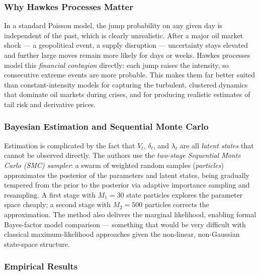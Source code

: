 \documentclass[12pt,a4paper]{article}
\begin{document}
\subsubsection*{Why Hawkes Processes Matter}

In a standard Poisson model, the jump probability on any given
day is independent of the past, which is clearly unrealistic.
After a major oil market shock --- a geopolitical event, a supply
disruption --- uncertainty stays elevated and further large moves
remain more likely for days or weeks. Hawkes processes model this
\textit{financial contagion} directly: each jump raises the
intensity, so consecutive extreme events are more probable.
This makes them far better suited than constant-intensity models
for capturing the turbulent, clustered dynamics that dominate
oil markets during crises, and for producing realistic estimates
of tail risk and derivative prices.

\subsubsection*{Bayesian Estimation and Sequential Monte Carlo}

Estimation is complicated by the fact that $V_t$, $\delta_t$,
and $\lambda_t$ are all \textit{latent states} that cannot be
observed directly. The authors use the \textit{two-stage
Sequential Monte Carlo (SMC) sampler}: a swarm of weighted random
samples (\textit{particles}) approximates the posterior of the
parameters and latent states, being gradually tempered from the
prior to the posterior via adaptive importance sampling and
resampling. A first stage with $M_1=30$ state particles explores
the parameter space cheaply; a second stage with $M_2=500$
particles corrects the approximation. The method also delivers
the marginal likelihood, enabling formal Bayes-factor model
comparison --- something that would be very difficult with
classical maximum-likelihood approaches given the non-linear,
non-Gaussian state-space structure.

\subsubsection*{Empirical Results}
\end{document}
